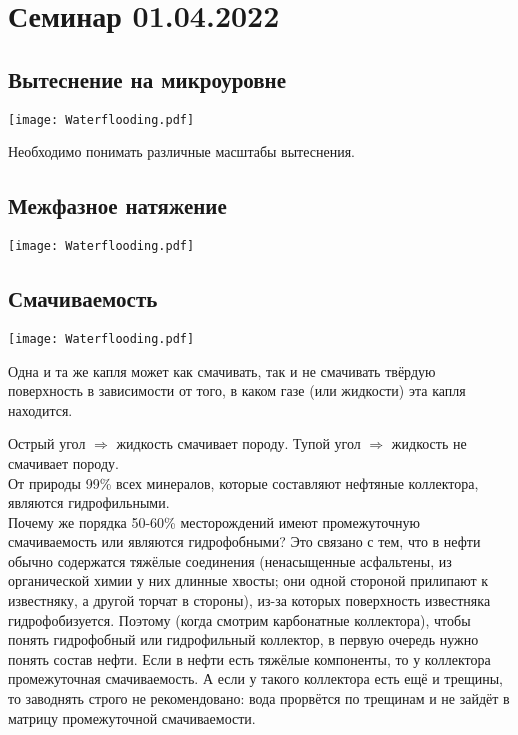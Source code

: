 \documentclass[main.tex]{subfiles}
\begin{document}
\section{Семинар 01.04.2022}

\subsection{Вытеснение на микроуровне}

\texttt{[image: Waterflooding.pdf]}

Необходимо понимать различные масштабы вытеснения.


\subsection{Межфазное натяжение}

\texttt{[image: Waterflooding.pdf]}

\subsection{Смачиваемость}

\texttt{[image: Waterflooding.pdf]}

Одна и та же капля может как смачивать, так и не смачивать твёрдую поверхность в зависимости от того, в каком газе (или жидкости) эта капля находится.


Острый угол $\Rightarrow$ жидкость смачивает породу. Тупой угол $\Rightarrow$ жидкость не смачивает породу.\\

От природы 99\% всех минералов, которые составляют нефтяные коллектора, являются гидрофильными.\\

Почему же порядка 50-60\% месторождений имеют промежуточную смачиваемость или являются гидрофобными? Это связано с тем, что в нефти обычно содержатся тяжёлые соединения (ненасыщенные асфальтены, из органической химии у них длинные хвосты; они одной стороной прилипают к известняку, а другой торчат в стороны), из-за которых поверхность известняка гидрофобизуется.
Поэтому (когда смотрим карбонатные коллектора), чтобы понять гидрофобный или гидрофильный коллектор, в первую очередь нужно понять состав нефти. Если в нефти есть тяжёлые компоненты, то у коллектора промежуточная смачиваемость.
А если у такого коллектора есть ещё и трещины, то заводнять строго не рекомендовано: вода прорвётся по трещинам и не зайдёт в матрицу промежуточной смачиваемости.
\end{document}
